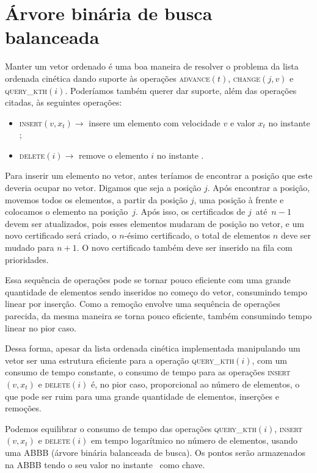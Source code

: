 
\section{Árvore binária de busca balanceada} \label{abb}

Manter um vetor ordenado é uma boa maneira de resolver o problema da
lista ordenada cinética dando suporte às operações
\textsc{advance}$(t)$, \textsc{change}$(j,v)$ e
\textsc{query\_kth}$(i)$. Poderíamos também querer dar suporte, além
das operações citadas, às seguintes operações:

\begin{itemize}
    \item \textsc{insert}$(v, x_t) \rightarrow$ insere um
    elemento com velocidade $v$ e valor $x_t$ no instante \now;
    \item \textsc{delete}$(i) \rightarrow$ remove o elemento
    $i$ no instante \now.
\end{itemize}

Para inserir um elemento no vetor, antes teríamos de encontrar a
posição que este deveria ocupar no vetor. Digamos que seja a posição
$j$. Após encontrar a posição, movemos todos os elementos, a partir
da posição $j$, uma posição à frente e colocamos o elemento na
posição~$j$. Após isso, os certificados de $j$~até~$n - 1$ devem ser
atualizados, pois esses elementos mudaram de posição no vetor, e um
novo certificado será criado, o $n$-ésimo certificado, o total de
elementos $n$ deve ser mudado para $n + 1$. O novo certificado
também deve ser inserido na fila com prioridades.

Essa sequência de operações pode se tornar pouco eficiente com uma
grande quantidade de elementos sendo inseridos no começo do vetor,
consumindo tempo linear por inserção. Como a remoção envolve uma
sequência de operações parecida, da mesma maneira se torna pouco
eficiente, também consumindo tempo linear no pior caso.

Dessa forma, apesar da lista ordenada cinética implementada
manipulando um vetor ser uma estrutura eficiente para a operação
\textsc{query\_kth}$(i)$, com um consumo de tempo constante, o
consumo de tempo para as operações \textsc{insert}$(v, x_t)$ e
\textsc{delete}$(i)$ é, no pior caso, proporcional ao número de
elementos, o que pode ser ruim para uma grande quantidade de
elementos, inserções e remoções.

Podemos equilibrar o consumo de tempo das operações
\textsc{query\_kth}$(i)$, \textsc{insert}$(v, x_t)$ e
\textsc{delete}$(i)$ em tempo logarítmico no número de elementos,
usando uma ABBB (árvore binária balanceada de busca). Os pontos
serão armazenados na ABBB tendo o seu valor no instante \now~como
chave.

